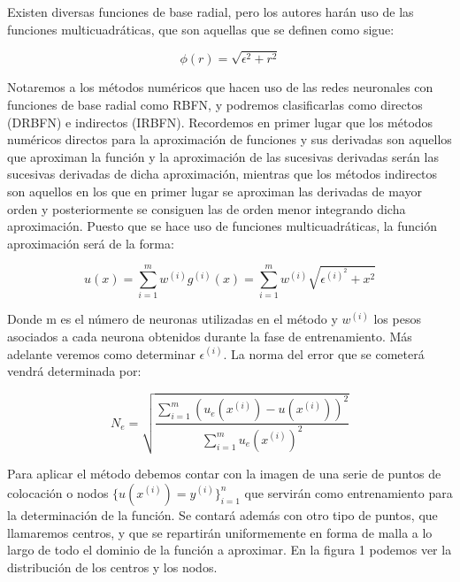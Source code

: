 \documentclass[12pt]{article}       %
\begin{document}
Existen diversas funciones de base radial, pero los autores harán uso de las funciones multicuadráticas, que son aquellas que se definen como sigue:

$$\phi(r) = \sqrt{\epsilon^2+r^2}$$

Notaremos a los métodos numéricos que hacen uso de las redes neuronales con funciones de base radial como RBFN, y podremos clasificarlas como directos (DRBFN) e indirectos (IRBFN). Recordemos en primer lugar que los métodos numéricos directos para la aproximación de funciones y sus derivadas son aquellos que aproximan la función y la aproximación de las sucesivas derivadas serán las sucesivas derivadas de dicha aproximación, mientras que los métodos indirectos son aquellos en los que en primer lugar se aproximan las derivadas de mayor orden y posteriormente se consiguen las de orden menor integrando dicha aproximación. Puesto que se hace uso de funciones multicuadráticas, la función aproximación será de la forma:

$$ u(x) = \sum\limits_{i=1}^{m} w^{(i)}g^{(i)}(x) = \sum\limits_{i=1}^{m} w^{(i)}\sqrt{\epsilon^{(i)^2}+x^2}$$

Donde m es el número de neuronas utilizadas en el método y $w^{(i)}$ los pesos asociados a cada neurona obtenidos durante la fase de entrenamiento. Más adelante veremos como determinar $\epsilon^{(i)}$. La norma del error que se cometerá vendrá determinada por:

$$N_e = \sqrt{\frac{\sum\limits_{i=1}^{m}(u_e(x^{(i)})-u(x^{(i)}))^2}{\sum\limits_{i=1}^{m}u_e(x^{(i)})^2}}$$

Para aplicar el método debemos contar con la imagen de una serie de puntos de colocación o nodos $\{u(x^{(i)})=y^{(i)}\}_{i=1}^{n}$ que servirán como entrenamiento para la determinación de la función. Se contará además con otro tipo de puntos, que llamaremos centros, y que se repartirán uniformemente en forma de malla a lo largo de todo el dominio de la función a aproximar. En la figura 1 podemos ver la distribución de los centros y los nodos.\\
\end{document}
